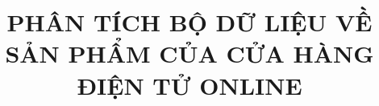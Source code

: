\documentclass[twoside, final]{hcmut_report}
\title{PHÂN TÍCH BỘ DỮ LIỆU VỀ SẢN PHẨM CỦA CỬA HÀNG ĐIỆN TỬ ONLINE}
\begin{document}
\begin{titlepage}
    \coverpage
\end{titlepage}
\newpage
\setcounter{page}{1}
\pagestyle{empty}
\tableofcontents
\pagestyle{fancy}
\pagebreak












\end{document}
